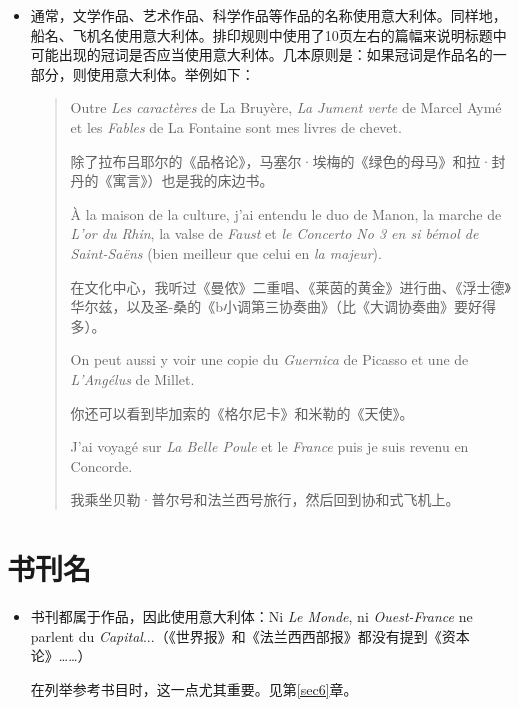 \begin{itemize}
    \item 通常，文学作品、艺术作品、科学作品等作品的名称使用意大利体。同样地，船名、飞机名使用意大利体。排印规则中使用了10页左右的篇幅来说明标题中可能出现的冠词是否应当使用意大利体。几本原则是：如果冠词是作品名的一部分，则使用意大利体。举例如下：
    
    \begin{quote}
        Outre \emph{Les caractères} de La Bruyère, \emph{La Jument verte} de Marcel Aymé et les \emph{Fables} de La Fontaine sont mes livres de chevet.

        \begin{bil}
            除了拉布吕耶尔的《品格论》，马塞尔·埃梅的《绿色的母马》和拉·封丹的《寓言》）也是我的床边书。
        \end{bil}

        À la maison de la culture, j'ai entendu le duo de Manon, la marche de \emph{L'or du Rhin}, la valse de \emph{Faust} et \emph{le Concerto No 3 en si bémol de Saint-Saëns} (bien meilleur que celui en \emph{la majeur}).

        \begin{bil}
            在文化中心，我听过《曼侬》二重唱、《莱茵的黄金》进行曲、《浮士德》华尔兹，以及圣-桑的《b小调第三协奏曲》（比《大调协奏曲》要好得多）。
        \end{bil}

        On peut aussi y voir une copie du \emph{Guernica} de Picasso et une de \emph{L'Angélus} de Millet.

        \begin{bil}
            你还可以看到毕加索的《格尔尼卡》和米勒的《天使》。
        \end{bil}

        J'ai voyagé sur \emph{La Belle Poule} et le \emph{France} puis je suis revenu en Concorde.

        \begin{bil}
            我乘坐贝勒·普尔号和法兰西号旅行，然后回到协和式飞机上。
        \end{bil}
    \end{quote}
\end{itemize}

\section{书刊名}

\begin{itemize}
    \item 书刊都属于作品，因此使用意大利体：Ni \emph{Le Monde}, ni \emph{Ouest-France }ne parlent du \emph{Capital}...（《世界报》和《法兰西西部报》都没有提到《资本论》……）
    
    在列举参考书目时，这一点尤其重要。见第\ref{sec6}章。
\end{itemize}

